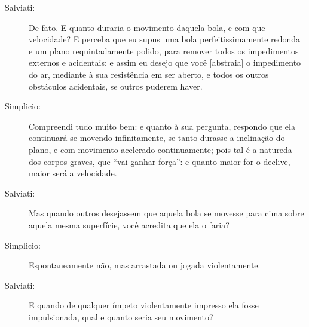 \begin{description}
\item[Salviati:] De fato. E quanto duraria o movimento daquela bola, e com que velocidade? E perceba que eu supus uma bola perfeitissimamente redonda e um plano requintadamente polido, para remover todos os impedimentos externos e acidentais: e assim eu desejo que você [abstraia] o impedimento do ar, mediante à sua resistência em ser aberto, e todos os outros obstáculos acidentais, se outros puderem haver.

\item[Simplicio:] Compreendi tudo muito bem: e quanto à sua pergunta, respondo que ela continuará se movendo infinitamente, se tanto durasse a inclinação do plano, e com movimento acelerado continuamente; pois tal é a natureda dos corpos graves, que ``vai ganhar força'': e quanto maior for o declive, maior será a velocidade.

\item[Salviati:] Mas quando outros desejassem que aquela bola se movesse para cima sobre aquela mesma superfície, você acredita que ela o faria?

\item[Simplicio:] Espontaneamente não, mas arrastada ou jogada violentamente.

\item[Salviati:] E quando de qualquer ímpeto violentamente impresso ela fosse impulsionada, qual e quanto seria seu movimento?


\end{description}
